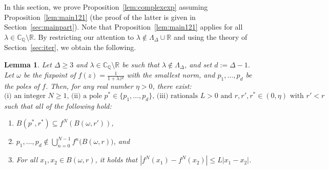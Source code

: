 \documentclass[11pt]{article}
\newtheorem{lemma}[theorem]{Lemma}
\def\Reals{\mathbb{R}}
\def\CQ{\mathbb{C}_{\mathbb{Q}}}
\def\LambdaD{\Lambda_\Delta}
\newcommand{\fn}[2]{#1^{#2}}
\begin{document}
In this section, we prove Proposition~\ref{lem:complexexp} assuming  Proposition~\ref{lem:main121} (the proof of the latter is given in Section~\ref{sec:mainpart}).
Note that  Proposition~\ref{lem:main121} applies for all $\lambda\in \CQ\setminus\Reals$. By restricting our attention to $\lambda\notin \LambdaD\cup \Reals$ and using the theory of Section~\ref{sec:iter}, we obtain the following.
\begin{lemma}\label{lem:tranpole}
Let $\Delta\geq 3$ and $\lambda\in \CQ\setminus\Reals$ be such that $\lambda\notin \LambdaD$, and set $d:=\Delta-1$. Let $\omega$ be the fixpoint of $f(z)=\frac{1}{1+\lambda z^{d}}$ with the smallest norm, and $p_1,\hdots, p_{d}$ be the poles of $f$. Then, for any  real number $\eta>0$, there exist:
\[\mbox{(i) an integer $N\geq 1$, (ii)  a pole $p^*\in\{p_1,\hdots, p_d\}$, (iii) rationals $L>0$ and $r,r',r^*\in(0,\eta)$ with $r'<r$}\] 
such that all of the following hold:
\begin{enumerate}
\item \label{it:ball} $B(p^*,r^*)\subseteq f^{N}(B(\omega,r'))$, 
\item \label{it:rfv} $p_1,\hdots,p_d\notin \bigcup^{N-1}_{n=0}\fn{f}{n}\big(B(\omega,r)\big)$, and 
\item \label{it:lip} For all $x_1,x_2\in B(\omega,r)$, it holds that $|f^{N}(x_1)-f^{N}(x_2)|\leq L|x_1-x_2|$.
\end{enumerate}
\end{lemma}
\end{document}

